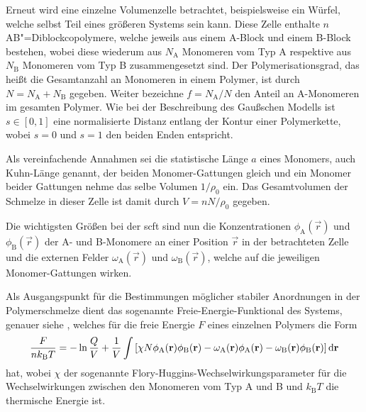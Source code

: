 \documentclass[../main.tex]{subfiles}
\begin{document}
Erneut wird eine einzelne Volumenzelle betrachtet, beispielsweise ein Würfel, welche selbst Teil eines größeren Systems sein kann.
Diese Zelle enthalte $n$ AB"=Diblockcopolymere, welche jeweils aus einem A-Block und einem B-Block bestehen, wobei diese wiederum aus $N_{\mathrm{A}}$ Monomeren vom Typ A respektive aus $N_{\mathrm{B}}$ Monomeren vom Typ B zusammengesetzt sind.
Der Polymerisationsgrad, das heißt die Gesamtanzahl an Monomeren in einem Polymer, ist durch $N = N_{\mathrm{A}} + N_{\mathrm{B}}$ gegeben.
Weiter bezeichne $f = N_{\mathrm{A}} / N$ den Anteil an A-Monomeren im gesamten Polymer.
Wie bei der Beschreibung des Gaußschen Modells ist $s \in [0, 1]$ eine normalisierte Distanz entlang der Kontur einer Polymerkette, wobei $s = 0$ und $s = 1$ den beiden Enden entspricht.

Als vereinfachende Annahmen sei die statistische Länge $a$ eines Monomers, auch Kuhn-Länge genannt, der beiden Monomer-Gattungen gleich und ein Monomer beider Gattungen nehme das selbe Volumen $1 / \rho_{0}$ ein.
Das Gesamtvolumen der Schmelze in dieser Zelle ist damit durch $V = n N / \rho_{0}$ gegeben.

Die wichtigsten Größen bei der \ac{scft} sind nun die Konzentrationen $\phi_{\mathrm{A}}(\vec{r})$ und $\phi_{\mathrm{B}}(\vec{r})$ der A- und B-Monomere an einer Position $\vec{r}$ in der betrachteten Zelle und die externen Felder $\omega_{\mathrm{A}}(\vec{r})$ und $\omega_{\mathrm{B}}(\vec{r})$, welche auf die jeweiligen Monomer-Gattungen wirken.

Als Ausgangspunkt für die Bestimmungen möglicher stabiler Anordnungen in der Polymerschmelze dient das sogenannte Freie-Energie-Funktional des Systems, genauer siehe \cite{Matsen:2006ud,Fredrickson:2006th}, welches für die freie Energie $F$ eines einzelnen Polymers die Form
\begin{equation}
\label{eq:freie_energie_funktional}
    \frac{F}{nk_{\mathrm{B}}T} = - \ln \frac{Q}{V} + \frac{1}{V} \int \left[ \chi N \phi_{\mathrm{A}}(\mathbf{r}) \phi_{\mathrm{B}}(\mathbf{r}) - \omega_{\mathrm{A}}(\mathbf{r}) \phi_{\mathrm{A}}(\mathbf{r}) - \omega_{\mathrm{B}}(\mathbf{r}) \phi_{\mathrm{B}}(\mathbf{r}) \right] \mathop{}\!\mathrm{d} \mathbf{r}
\end{equation}
hat, wobei $\chi$ der sogenannte Flory-Huggins-Wechselwirkungsparameter für die Wechselwirkungen zwischen den Monomeren vom Typ A und B und $k_{\mathrm{B}} T$ die thermische Energie ist.
\end{document}

